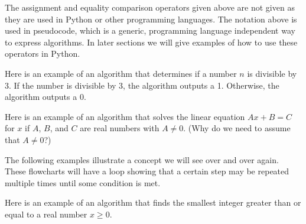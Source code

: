 \documentclass{ximera}
\begin{document}
The assignment and equality comparison operators given above are not given as they are used in Python or other programming languages. The notation above is used in pseudocode, which is a generic, programming language independent way to express algorithms. In later sections we will give examples of how to use these operators in Python.

Here is an example of an algorithm that determines if a number $n$ is divisible by 3. If the number is divisible by 3, the algorithm outputs a 1. Otherwise, the algorithm outputs a 0.

\begin{center}
\end{center}

Here is an example of an algorithm that solves the linear equation $Ax+B=C$ for $x$ if $A$, $B$, and $C$ are real numbers with $A\neq 0$. (Why do we need to assume that $A\neq 0$?)

\begin{center}
\end{center}

The following examples illustrate a concept we will see over and over again. These flowcharts will have a loop showing that a certain step may be repeated multiple times until some condition is met.

Here is an example of an algorithm that finds the smallest integer greater than or equal to a real number $x\geq 0$.
\end{document}
